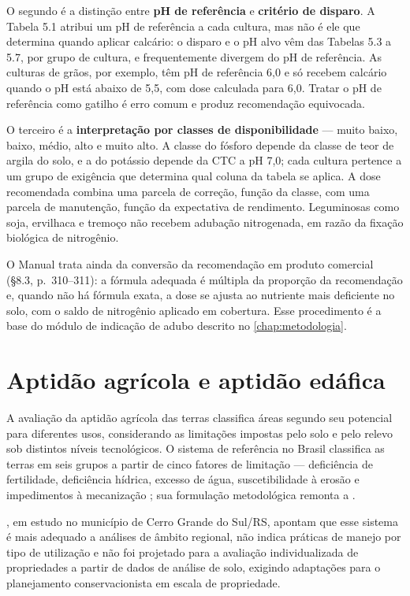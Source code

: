 O segundo é a distinção entre \textbf{pH de referência} e \textbf{critério de disparo}.
A Tabela 5.1 atribui um pH de referência a cada cultura, mas não é ele que determina
quando aplicar calcário: o disparo e o pH alvo vêm das Tabelas 5.3 a 5.7, por grupo de
cultura, e frequentemente divergem do pH de referência. As culturas de grãos, por
exemplo, têm pH de referência 6,0 e só recebem calcário quando o pH está abaixo de 5,5,
com dose calculada para 6,0. Tratar o pH de referência como gatilho é erro comum e
produz recomendação equivocada.

O terceiro é a \textbf{interpretação por classes de disponibilidade} --- muito baixo,
baixo, médio, alto e muito alto. A classe do fósforo depende da classe de teor de argila
do solo, e a do potássio depende da CTC a pH 7,0; cada cultura pertence a um grupo de
exigência que determina qual coluna da tabela se aplica. A dose recomendada combina uma
parcela de correção, função da classe, com uma parcela de manutenção, função da
expectativa de rendimento. Leguminosas como soja, ervilhaca e tremoço não recebem
adubação nitrogenada, em razão da fixação biológica de nitrogênio.

O Manual trata ainda da conversão da recomendação em produto comercial
(\S8.3, p.~310--311): a fórmula adequada é múltipla da proporção da recomendação e,
quando não há fórmula exata, a dose se ajusta ao nutriente mais deficiente no solo, com
o saldo de nitrogênio aplicado em cobertura. Esse procedimento é a base do módulo de
indicação de adubo descrito no \cref{chap:metodologia}.

\section{Aptidão agrícola e aptidão edáfica}

A avaliação da aptidão agrícola das terras classifica áreas segundo seu potencial para
diferentes usos, considerando as limitações impostas pelo solo e pelo relevo sob
distintos níveis tecnológicos. O sistema de referência no Brasil classifica as terras em
seis grupos a partir de cinco fatores de limitação --- deficiência de fertilidade,
deficiência hídrica, excesso de água, suscetibilidade à erosão e impedimentos à
mecanização \citep{EmbrapaAptidao2025}; sua formulação metodológica remonta a
\cite{RamalhoFilhoBeek1995}.

\cite{Hofig2015}, em estudo no município de Cerro Grande do Sul/RS, apontam que esse
sistema é mais adequado a análises de âmbito regional, não indica práticas de manejo por
tipo de utilização e não foi projetado para a avaliação individualizada de propriedades
a partir de dados de análise de solo, exigindo adaptações para o planejamento
conservacionista em escala de propriedade.

